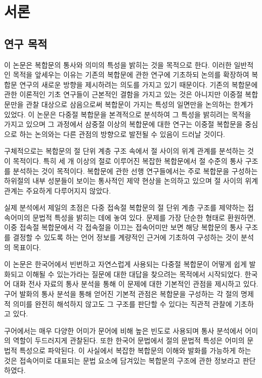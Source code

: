 
\chapter{서론}\label{chap:intro}

\section{연구 목적}

이 논문은 복합문의 통사와 의미의 특성을 밝히는 것을 목적으로 한다. 이러한
일반적인 목적을 앞세우는 이유는 기존의 복합문에 관한 연구에 기초하되 논의를
확장하여 복합문 연구의 새로운 방향을 제시하려는 의도를 가지고 있기 때문이다.
기존의 복합문에 관한 이론적인 기초 연구들이 근본적인 결함을 가지고 있는 것은
아니지만 이중절 복합문만을 관찰 대상으로 삼음으로써 복합문이 가지는 특성의
일면만을 논의하는 한계가 있었다. 이 논문은 다중절 복합문을 본격적으로 분석하여
그 특성을 밝히려는 목적을 가지고 있으며 그 과정에서 삼중절 이상의 복합문에 대한
연구는 이중절 복합문을 중심으로 하는 논의와는 다른 관점의 방향으로 발전될 수
있음이 드러날 것이다.


구체적으로는 복합문의 절 단위 계층 구조 속에서 절 사이의 위계 관계를 분석하는
것이 목적이다. 특히 세 개 이상의 절로 이루어진 복잡한 복합문에서 절 수준의 통사
구조를 분석하는 것이 목적이다. 복합문에 관한 선행 연구들에서는 주로 복합문을
구성하는 하위절의 내부 성분들이 보이는 통사적인 제약 현상을 논의하고 있으며 절
사이의 위계 관계는 주요하게 다루어지지 않았다.


실제 분석에서 제일의 초점은 다중 접속절 복합문의 절 단위 계층 구조를 제약하는
접속어미의 문법적 특성을 밝히는 데에 놓여 있다. 문제를 가장 단순한 형태로
환원하면, 이중 접속절 복합문에서 각 접속절을 이끄는 접속어미만 보면 해당
복합문의 통사 구조를 결정할 수 있도록 하는 언어 정보를 계량적인 근거에 기초하여
구성하는 것이 분석의 목표이다.

이 논문은 한국어에서 빈번하고 자연스럽게 사용되는 다중절 복합문이 어떻게 쉽게
발화되고 이해될 수 있는가라는 질문에 대한 대답을 찾으려는 목적에서 시작되었다.
\citet{YuHyeonJo2004}\와 \citet{YuHyeonJo2007}\은 한국어 대화 전사 자료의 통사
분석을 통해 이 문제에 대한 기본적인 관점을 제시하고 있다.  
구어 발화의 통사 분석을 통해 얻어진 기본적 관점은 복합문을 구성하는 각 절의
명제적 의미를 완전히 해석하지 않고도 그 구조를 판단할 수 있다는 직관적 관찰에
기초하고 있다. 

구어에서는 매우 다양한 어미가 문어에 비해 높은 빈도로 사용되며 통사 분석에서
어미의 역할이 두드러지게 관찰된다. 또한 한국어 문법에서 절의 문법적 특성은
어미의 문법적 특성으로 파악된다. 이 사실에서 복잡한 복합문의  이해와 발화를
가능하게 하는 것은 접속어미로 대표되는 문법 요소에 담겨있는 복합문의 구조에
관한 정보라고 판단하였다.


